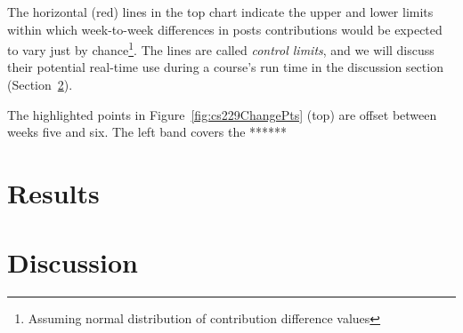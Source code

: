 The horizontal (red) lines in the top chart indicate the upper and
lower limits within which week-to-week differences in posts
contributions would be expected to vary just by
chance\footnote{Assuming normal distribution of contribution
  difference values}. The lines are called {\em control limits}, and
we will discuss their potential real-time use during a course's run
time in the discussion section (Section~\ref{sec:discussion}).

The highlighted points in Figure~\ref{fig:cs229ChangePts} (top)
are offset between weeks five and six. The left band covers the ******

\section{Results}
\section{Discussion}
\label{sec:discussion}






